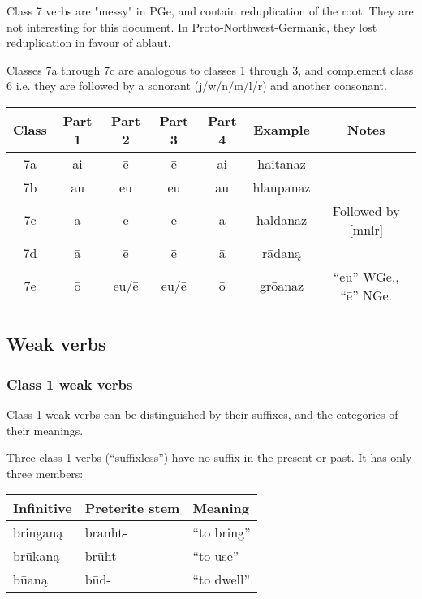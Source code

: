 \documentclass{article}
\begin{document}
Class 7 verbs are "messy" in PGe, and contain reduplication of the root. They are not interesting for this document. In Proto-Northwest-Germanic, they lost reduplication in favour of ablaut.

Classes 7a through 7c are analogous to classes 1 through 3, and complement class 6 i.e. they are followed by a sonorant (j/w/n/m/l/r) and another consonant.

\begin{center}
\begin{tabular}{ | c | c c c c c c | }
\hline
Class & Part 1 & Part 2 & Part 3 & Part 4 & Example & Notes \\
\hline
7a & ai & ē    & ē    & ai & haitanaz  & \\
7b & au & eu   & eu   & au & hlaupanaz & \\
7c & a  & e    & e    & a  & haldanaz  & Followed by [mnlr] \\
7d & ā  & ē    & ē    & ā  & rādaną    & \\
7e & ō  & eu/ē & eu/ē & ō  & grōanaz   & ``eu'' WGe., ``ē'' NGe. \\
\hline
\end{tabular}    
\end{center}

\subsection{Weak verbs}

\subsubsection{Class 1 weak verbs}

Class 1 weak verbs can be distinguished by their suffixes, and the categories of their meanings.

Three class 1 verbs (``suffixless'') have no suffix in the present or past. It has only three members:

\begin{center}
\begin{tabular}{ | l l l | }
\hline
Infinitive & Preterite stem &  Meaning \\
\hline
bringaną & branht- & ``to bring'' \\
brūkaną & brūht- & ``to use'' \\
būaną & būd- & ``to dwell'' \\
\hline
\end{tabular}
\end{center}
\end{document}
